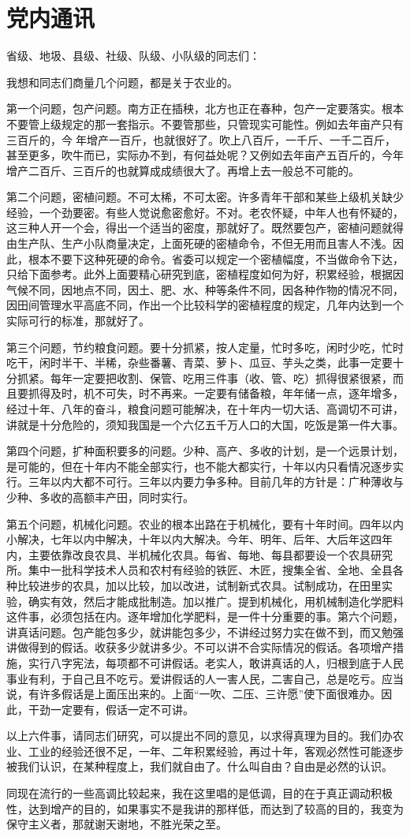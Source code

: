 \section[党内通讯（一九五九年四月二十九日）]{党内通讯}


省级、地圾、县级、社级、队级、小队级的同志们：

我想和同志们商量几个问题，都是关于农业的。

第一个问题，包产问题。南方正在插秧，北方也正在春种，包产一定要落实。根本不要管上级规定的那一套指示。不要管那些，只管现实可能性。例如去年亩产只有三百斤的，今年增产一百斤，也就很好了。吹上八百斤，一千斤、一千二百斤，甚至更多，吹牛而已，实际办不到，有何益处呢？又例如去年亩产五百斤的，今年增产二百斤、三百斤的也就算成成绩很大了。再增上去一般总不可能的。

第二个问题，密植问题。不可太稀，不可太密。许多青年干部和某些上级机关缺少经验，一个劲要密。有些人觉说愈密愈好。不对。老农怀疑，中年人也有怀疑的，这三种人开一个会，得出一个适当的密度，那就好了。既然要包产，密植问题就得由生产队、生产小队商量决定，上面死硬的密植命令，不但无用而且害人不浅。因此，根本不要下这种死硬的命令。省委可以规定一个密植幅度，不当做命令下达，只给下面参考。此外上面要精心研究到底，密植程度如何为好，积累经验，根据因气候不同，因地点不同，因土、肥、水、种等条件不同，因各种作物的情况不同，因田间管理水平高底不同，作出一个比较科学的密植程度的规定，几年内达到一个实际可行的标准，那就好了。

第三个问题，节约粮食问题。要十分抓紧，按人定量，忙时多吃，闲时少吃，忙时吃干，闲时半干、半稀，杂些番薯、青菜、萝卜、瓜豆、芋头之类，此事一定要十分抓紧。每年一定要把收割、保管、吃用三件事（收、管、吃）抓得很紧很紧，而且要抓得及时，机不可失，时不再来。一定要有储备粮，年年储一点，逐年增多，经过十年、八年的奋斗，粮食问题可能解决，在十年内一切大话、高调切不可讲，讲就是十分危险的，须知我国是一个六亿五千万人口的大国，吃饭是第一件大事。

第四个问题，扩种面积要多的问题。少种、高产、多收的计划，是一个远景计划，是可能的，但在十年内不能全部实行，也不能大都实行，十年以内只看情况逐步实行。三年以内大都不可行。三年以内要力争多种。目前几年的方针是：广种薄收与少种、多收的高额丰产田，同时实行。

第五个问题，机械化问题。农业的根本出路在于机械化，要有十年时间。四年以内小解决，七年以内中解决，十年以内大解决。今年、明年、后年、大后年这四年内，主要依靠改良农具、半机械化农具。每省、每地、每县都要设一个农具研究所。集中一批科学技术人员和农村有经验的铁匠、木匠，搜集全省、全地、全县各种比较进步的农具，加以比较，加以改进，试制新式农具。试制成功，在田里实验，确实有效，然后才能成批制造。加以推广。提到机械化，用机械制造化学肥料这件事，必须包括在内。逐年增加化学肥料，是一件十分重要的事。第六个问题，讲真话问题。包产能包多少，就讲能包多少，不讲经过努力实在做不到，而又勉强讲做得到的假话。收获多少就讲多少。不可以讲不合实际情况的假话。各项增产措施，实行八字宪法，每项都不可讲假话。老实人，敢讲真话的人，归根到底于人民事业有利，于自己且不吃亏。爱讲假话的人一害人民，二害自己，总是吃亏。应当说，有许多假话是上面压出来的。上面“一吹、二压、三许愿”使下面很难办。因此，干劲一定要有，假话一定不可讲。

以上六件事，请同志们研究，可以提出不同的意见，以求得真理为目的。我们办农业、工业的经验还很不足，一年、二年积累经验，再过十年，客观必然性可能逐步被我们认识，在某种程度上，我们就自由了。什么叫自由？自由是必然的认识。

同现在流行的一些高调比较起来，我在这里唱的是低调，目的在于真正调动积极性，达到增产的目的，如果事实不是我讲的那样低，而达到了较高的目的，我变为保守主义者，那就谢天谢地，不胜光荣之至。


